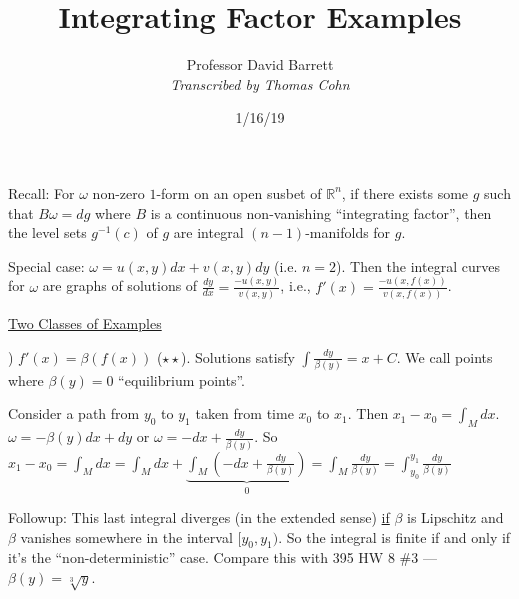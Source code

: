 \documentclass[10pt,letterpaper]{article}
\author{Professor David Barrett\\ \small\textit{Transcribed by Thomas Cohn}}
\title{Integrating Factor Examples}
\date{1/16/19} %
\newcommand{\n}{\hfill\break}
\newcommand{\reals}{\mathbb{R}}
\newcommand{\R}{\reals}
\newcommand{\inv}{^{-1}}
\newcommand{\paren}[1]{\left(#1\right)}
\begin{document}
\maketitle
\setlength\RaggedRightParindent{\parindent}
\RaggedRight

\par\noindent Recall: For $\omega$ non-zero $1$-form on an open susbet of $\R^{n}$, if there exists some $g$ such that $B\omega=dg$ where $B$ is a continuous non-vanishing ``integrating factor'', then the level sets $g\inv(c)$ of $g$ are integral $(n-1)$-manifolds for $g$.\n

\par\noindent Special case: $\omega=u(x,y)dx+v(x,y)dy$ (i.e. $n=2$).\n
Then the integral curves for $\omega$ are graphs of solutions of $\frac{dy}{dx}=\frac{-u(x,y)}{v(x,y)}$, i.e., $f'(x)=\frac{-u(x,f(x))}{v(x,f(x))}$.\n

\par\noindent\underline{Two Classes of Examples}\n

\par{}) $f'(x)=\beta(f(x))$ ($\star\star$). Solutions satisfy $\int\frac{dy}{\beta(y)}=x+C$.\n
We call points where $\beta(y)=0$ ``equilibrium points''.\n

\par\noindent Consider a path from $y_{0}$ to $y_{1}$ taken from time $x_{0}$ to $x_{1}$. Then $x_{1}-x_{0}=\int_{M}dx$.\n
$\omega=-\beta(y)dx+dy$ or $\omega=-dx+\frac{dy}{\beta(y)}$.\n
So $\displaystyle x_{1}-x_{0}=\int_{M}dx=\int_{M}dx+\underbrace{\int_{M}\paren{-dx+\frac{dy}{\beta(y)}}}_{0}=\int_{M}\frac{dy}{\beta(y)}=\int_{y_{0}}^{y_{1}}\frac{dy}{\beta(y)}$\n

\par\noindent Followup: This last integral diverges (in the extended sense) \underline{if} $\beta$ is Lipschitz and $\beta$ vanishes somewhere in the interval $[y_{0},y_{1})$. So the integral is finite if and only if it's the ``non-deterministic'' case. Compare this with 395 HW 8 \#3 --- $\beta(y)=\sqrt[3]{y}$.\n
\end{document}
